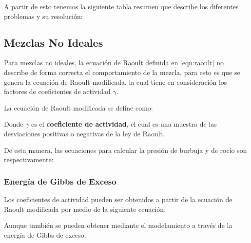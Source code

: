 
A partir de esto tenemos la siguiente tabla resumen que describe los diferentes problemas y su resolución:

\clearpage
\subsection{Mezclas No Ideales}

Para mezclas no ideales, la ecuación de Raoult definida en \ref{eqn:raoult} no describe de forma correcta el comportamiento de la mezcla, para esto es que 
se genera la ecuación de Raoult modificada, la cual tiene en consideración los factores de coeficientes de actividad $\gamma$.


La ecuación de Raoult modificada se define como:


Donde $\gamma$ es el \textbf{coeficiente de actividad}, el cual es una muestra de las desviaciones positivas o negativas de la ley de Raoult.

De esta manera, las ecuaciones para calcular la presión de burbuja y de rocío son respectivamente:


\subsubsection{Energía de Gibbs de Exceso}

Los coeficientes de actividad pueden ser obtenidos a partir de la ecuación de Raoult modificada por medio de la siguiente ecuación:


Aunque también se pueden obtener mediante el modelamiento a través de la energía de Gibbs de exceso.


